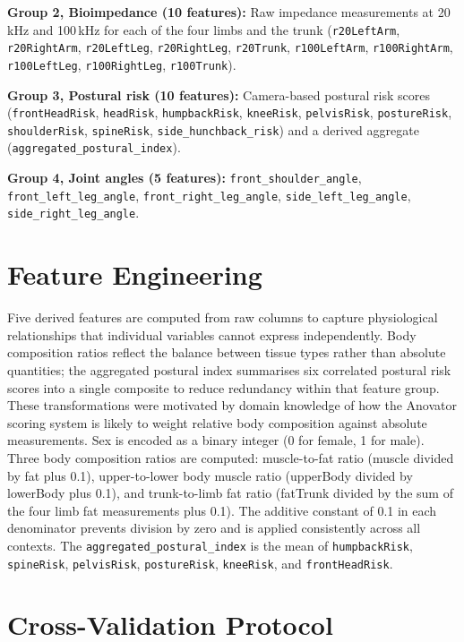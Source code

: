 \documentclass[11pt,a4paper]{report}
\begin{document}
\textbf{Group 2, Bioimpedance (10 features):} Raw impedance measurements at 20\,kHz and 100\,kHz
for each of the four limbs and the trunk
(\texttt{r20LeftArm}, \texttt{r20RightArm}, \texttt{r20LeftLeg}, \texttt{r20RightLeg},
\texttt{r20Trunk}, \texttt{r100LeftArm}, \texttt{r100RightArm}, \texttt{r100LeftLeg},
\texttt{r100RightLeg}, \texttt{r100Trunk}).

\textbf{Group 3, Postural risk (10 features):} Camera-based postural risk scores
(\texttt{frontHeadRisk}, \texttt{headRisk}, \texttt{humpbackRisk}, \texttt{kneeRisk},
\texttt{pelvisRisk}, \texttt{postureRisk}, \texttt{shoulderRisk}, \texttt{spineRisk},
\texttt{side\_hunchback\_risk}) and a derived aggregate (\texttt{aggregated\_postural\_index}).

\textbf{Group 4, Joint angles (5 features):} \texttt{front\_shoulder\_angle},
\texttt{front\_left\_leg\_angle}, \texttt{front\_right\_leg\_angle},
\texttt{side\_left\_leg\_angle}, \texttt{side\_right\_leg\_angle}.

\section{Feature Engineering}

Five derived features are computed from raw columns to capture physiological relationships that individual variables cannot express independently. Body composition ratios reflect the balance between tissue types rather than absolute quantities; the aggregated postural index summarises six correlated postural risk scores into a single composite to reduce redundancy within that feature group. These transformations were motivated by domain knowledge of how the Anovator scoring system is likely to weight relative body composition against absolute measurements. Sex is encoded as a binary integer (0 for
female, 1 for male). Three body composition ratios are computed: muscle-to-fat ratio (muscle divided
by fat plus 0.1), upper-to-lower body muscle ratio (upperBody divided by lowerBody plus 0.1), and
trunk-to-limb fat ratio (fatTrunk divided by the sum of the four limb fat measurements plus 0.1).
The additive constant of 0.1 in each denominator prevents division by zero and is applied
consistently across all contexts. The \texttt{aggregated\_postural\_index} is the mean of
\texttt{humpbackRisk}, \texttt{spineRisk}, \texttt{pelvisRisk}, \texttt{postureRisk},
\texttt{kneeRisk}, and \texttt{frontHeadRisk}.

\section{Cross-Validation Protocol}
\end{document}
